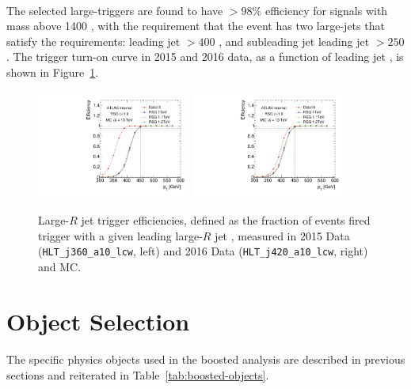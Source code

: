 \paragraph{}
The selected large-\R triggers are found to have $>98\%$ efficiency for signals with mass above 1400 \GeV, with the requirement that the event has two large-\R jets that satisfy the \pt requirements: leading jet \pt $> 400$ \GeV, and subleading jet leading jet \pt $> 250$ \GeV. The trigger turn-on curve in 2015 and 2016 data, as a function of leading jet \pt, is shown in Figure~\ref{fig:boosted-trigger-HLT-turnon}.
\begin{figure}[htbp!]
\begin{center}
  \includegraphics[width=0.45\textwidth,angle=-90]{figures/boosted/Trigger/trig_15_b77_pT_Efficiency.pdf}
  \includegraphics[width=0.45\textwidth,angle=-90]{figures/boosted/Trigger/trig_16_b77_pT_Efficiency.pdf}
  \caption{Large-$R$ jet trigger efficiencies, defined as the fraction of events fired trigger with a given leading large-$R$ jet \pt, measured in 2015 Data (\texttt{HLT\_j360\_a10\_lcw}, left) and 2016 Data (\texttt{HLT\_j420\_a10\_lcw}, right) and MC.}
  \label{fig:boosted-trigger-HLT-turnon}
\end{center}
\end{figure}


\section{Object Selection}
\paragraph{}
The specific physics objects used in the boosted analysis are described in previous sections and reiterated in Table~\ref{tab:boosted-objects}.

